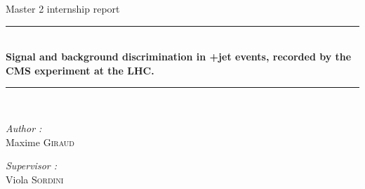 \documentclass[11pt,a4paper]{report}
\theoremstyle{break}
\begin{document}
\begin{titlepage}
\begin{center}
{\large Master 2 internship report}\\[0.5cm]

\rule{\linewidth}{0.5mm} \\[0.4cm]
{ \huge \bfseries Signal and background discrimination in \textgamma+jet events, recorded by the CMS experiment at the LHC. \\[0.4cm] }
\rule{\linewidth}{0.5mm} \\[1.5cm]

\noindent
\begin{minipage}{0.4\textwidth}
  \begin{flushleft} \large
    \emph{Author :}\\
    Maxime \textsc{Giraud}\\
  \end{flushleft}
\end{minipage}%
\begin{minipage}{0.4\textwidth}
  \begin{flushright} \large
    \emph{Supervisor :} \\
    Viola \textsc{Sordini}\\
  \end{flushright}
\end{minipage}

\vfill


\end{center}
\end{titlepage}

%
%
%
\clearpage
\tableofcontents
\end{document}
